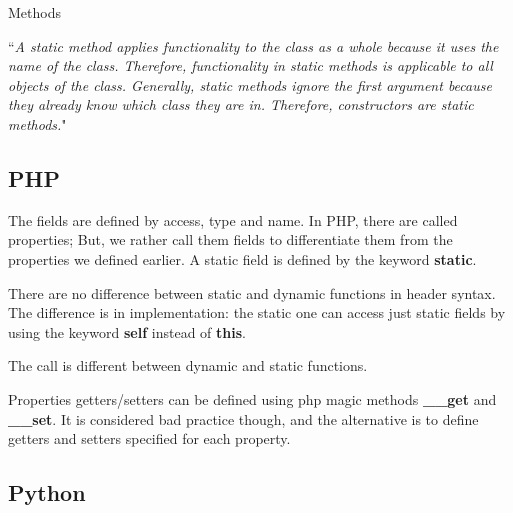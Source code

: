 \documentclass{KodeBook}
\begin{document}


Methods





``\textit{A static method applies functionality to the class as a whole because it uses the name of the class. Therefore, functionality in static methods is applicable to all objects of the class. Generally, static methods ignore the first argument because they already know which class they are in. Therefore, constructors are static methods.}"

\subsection{PHP}

The fields are defined by access, type and name.
In PHP, there are called properties; But, we rather call them fields to differentiate them from the properties we defined earlier.
A static field is defined by the keyword \textbf{static}.



There are no difference between static and dynamic functions in header syntax. 
The difference is in implementation: the static one can access just static fields by using the keyword \textbf{self} instead of \textbf{this}.



The call is different between dynamic and static functions.



Properties getters/setters can be defined using php magic methods \textbf{\_\_get} and \textbf{\_\_set}.
It is considered bad practice though, and the alternative is to define getters and setters specified for each property.



\subsection{Python}
\end{document}
